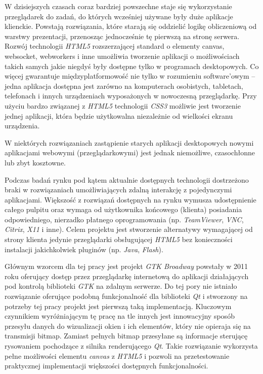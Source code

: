
W dzisiejszych czasach coraz bardziej powszechne staje się wykorzystanie przeglądarek do zadań, do których wcześniej używane były duże aplikacje klienckie. Powstają rozwiązania, które starają się oddzielić logikę obliczeniową od warstwy prezentacji, przenosząc jednocześnie tę pierwszą na stronę serwera. Rozwój technologii \emph{HTML5} rozszerzającej standard o elementy canvas, websocket, webworkers i inne umożliwia tworzenie aplikacji o możliwościach takich samych jakie niegdyś były dostępne tylko w programach desktopowych. Co więcej gwarantuje międzyplatformowość nie tylko w rozumieniu software'owym -- jedna aplikacja dostępna jest zarówno na komputerach osobistych, tabletach, telefonach i innych urządzeniach wyposażonych w nowoczesną przeglądarkę. Przy użyciu bardzo związanej z \emph{HTML5} technologii \emph{CSS3} możliwie jest tworzenie jednej aplikacji, która będzie użytkowalna niezależnie od wielkości ekranu urządzenia.\cite{responsive}

W niektórych rozwiązaniach zastąpienie starych aplikacji desktopowych nowymi aplikacjami webowymi (przeglądarkowymi) jest jednak niemożliwe, czasochłonne lub zbyt kosztowne.

Podczas badań rynku pod kątem aktualnie dostępnych technologii dostrzeżono braki w rozwiązaniach umożliwiających zdalną interakcję z pojedynczymi aplikacjami. Większość z rozwiązań dostępnych na rynku wymusza udostępnienie całego pulpitu oraz wymaga od użytkownika końcowego (klienta) posiadania odpowiedniego, nierzadko płatnego oprogramowania (np. \emph{TeamViewer}, \emph{VNC}, \emph{Citrix}, \emph{X11} i inne). Celem projektu jest stworzenie alternatywy wymagającej od strony klienta jedynie przeglądarki obsługującej \emph{HTML5} bez konieczności instalacji jakichkolwiek pluginów (np. \emph{Java}, \emph{Flash}).

Głównym wzorcem dla tej pracy jest projekt \emph{GTK Broadway} powstały w 2011 roku oferujący dostęp przez przeglądarkę internetową do aplikacji działających pod kontrolą biblioteki \emph{GTK} na zdalnym serwerze. Do tej pory nie istniało rozwiązanie oferujące podobną funkcjonalność dla biblioteki \emph{Qt} i stworzony na potrzeby tej pracy projekt jest pierwszą taką implementacją. Kluczowym czynnikiem wyróżniającym tę pracę na tle innych jest innowacyjny sposób przesyłu danych do wizualizacji okien i ich elementów, który nie opieraja się na transmisji bitmap. Zamiast pełnych bitmap przesyłane są informacje sterującę rysowaniem pochodzące z silnika renderującego \emph{Qt}.
Takie rozwiązanie wykorzysta pełne możliwości elementu \emph{canvas} z \emph{HTML5} i pozwoli na przetestowanie praktycznej implementacji większości dostępnych funkcjonalności.

